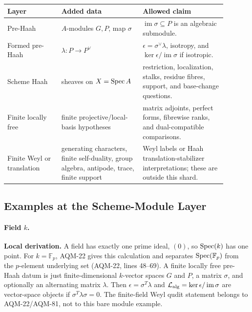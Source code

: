 \begin{center}
\small\setlength{\tabcolsep}{3pt}
\begin{tabular}{p{0.22\linewidth}p{0.33\linewidth}p{0.34\linewidth}}
\textbf{Layer} & \textbf{Added data} & \textbf{Allowed claim} \\
\hline
Pre-Haah & \(A\)-modules \(G,P\), map \(\sigma\) &
\(\operatorname{im}\sigma\subseteq P\) is an algebraic submodule. \\
Formed pre-Haah & \(\lambda:P\to P^\vee\) &
\(\epsilon=\sigma^\vee\lambda\), isotropy, and
\(\ker\epsilon/\operatorname{im}\sigma\) if isotropic. \\
Scheme Haah & sheaves on \(X=\operatorname{Spec} A\) &
restriction, localization, stalks, residue fibres, support, and base-change
questions. \\
Finite locally free & finite projective/local-basis hypotheses &
matrix adjoints, perfect forms, fibrewise ranks, and dual-compatible
comparisons. \\
Finite Weyl or translation & generating characters, finite self-duality, group
algebra, antipode, trace, finite support &
Weyl labels or Haah translation-stabilizer interpretations; these are outside
this shard. \\
\end{tabular}
\end{center}

\subsection{Examples at the Scheme-Module Layer}

\paragraph{Field \(k\).}
\textbf{Local derivation.}  A field has exactly one prime ideal, \((0)\), so
\(\operatorname{Spec}(k)\) has one point.  For \(k=\mathbb F_p\), AQM-22 gives this
calculation and separates \(\operatorname{Spec}(\mathbb F_p)\) from the \(p\)-element
underlying set (AQM-22, lines 48--69).  A finite locally free pre-Haah datum is
just finite-dimensional \(k\)-vector spaces \(G\) and \(P\), a matrix
\(\sigma\), and optionally an alternating matrix \(\lambda\).  Then
\(\epsilon=\sigma^T\lambda\) and
\(\mathcal L_{\rm alg}=\ker\epsilon/\operatorname{im}\sigma\) are vector-space
objects if \(\sigma^T\lambda\sigma=0\).  The finite-field Weyl qudit statement
belongs to AQM-22/AQM-81, not to this bare module example.

